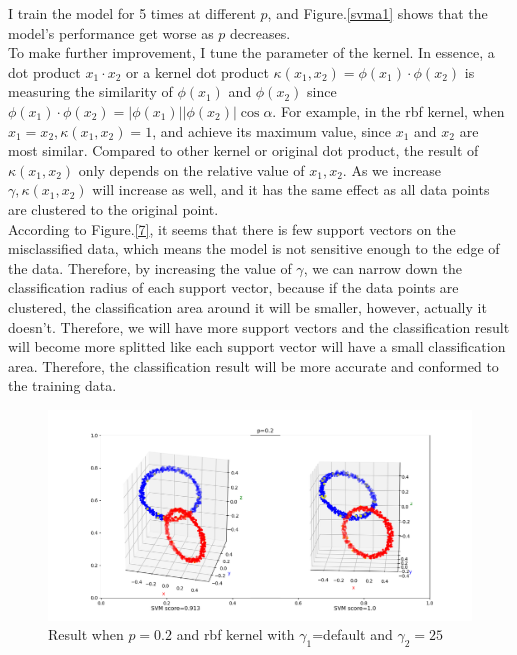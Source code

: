 \documentclass{article}
\begin{document}
I train the model for 5 times at different $p$, and Figure.\ref{svma1} shows that the model's performance get worse as $p$ decreases.
\\To make further improvement, I tune the parameter of the kernel. In essence, a dot product $x_1\cdot x_2$ or a kernel dot product $\kappa(x_1,x_2)=\phi(x_1)\cdot \phi(x_2)$ is measuring the similarity of $\phi(x_1)$ and $\phi(x_2)$ since $\phi(x_1)\cdot \phi(x_2)=|\phi(x_1)||\phi(x_2)|\cos\alpha$. For example, in the rbf kernel, when $x_1=x_2,\kappa(x_1,x_2)=1$, and achieve its maximum value, since $x_1$ and $x_2$ are most similar. Compared to other kernel or original dot product, the result of $\kappa(x_1,x_2)$ only depends on the relative value of $x_1,x_2$. As we increase $\gamma,\kappa(x_1,x_2)$ will increase as well, and it has the same effect as all data points are clustered to the original point.
\\According to Figure.\ref{7}, it seems that there is few support vectors on the misclassified data, which means the model is not sensitive enough to the edge of the data. Therefore, by increasing the value of $\gamma$, we can narrow down the classification radius of each support vector, because if the data points are clustered, the classification area around it will be smaller, however, actually it doesn't. Therefore,
 we will have more support vectors and the classification result will become more splitted like each support vector will have a small classification area. Therefore, the classification result will be more accurate and conformed to the training data.
\begin{figure}[H]
    \centering
    \includegraphics[scale=0.5]{6.png}
    \caption{Result when $p=0.2$ and rbf kernel with $\gamma_1$=default and $\gamma_2=25$}
    \label{6}
\end{figure}
\end{document}
